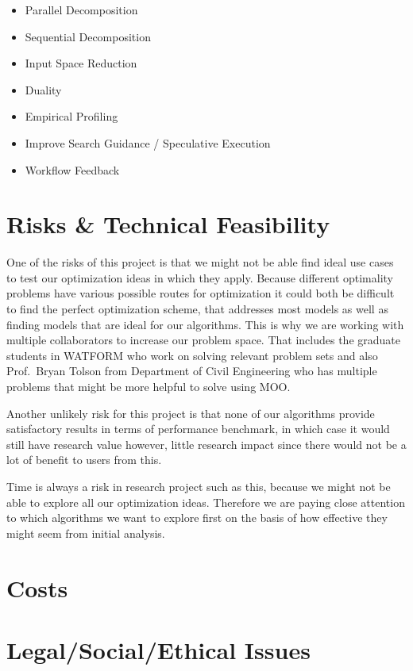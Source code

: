 \documentclass[11pt]{article}
\begin{document}
\begin{itemize}
  \item Parallel Decomposition
  \item Sequential Decomposition
  \item Input Space Reduction
  \item Duality
  \item Empirical Profiling
  \item Improve Search Guidance / Speculative Execution
  \item Workflow Feedback
\end{itemize}

\section{Risks \& Technical Feasibility}
One of the risks of this project is that we might not be able find ideal use cases to test our optimization ideas in which they apply. Because different optimality problems have various possible routes for optimization it could both be difficult to find the perfect optimization scheme, that addresses most models as well as finding models that are ideal for our algorithms. This is why we are working with multiple collaborators to increase our problem space. That includes the graduate students in WATFORM who work on solving relevant problem sets and also Prof.\ Bryan Tolson from Department of Civil Engineering who has multiple problems that might be more helpful to solve using MOO.

Another unlikely risk for this project is that none of our algorithms provide satisfactory results in terms of performance benchmark, in which case it would still have research value however, little research impact since there would not be a lot of benefit to users from this.

Time is always a risk in research project such as this, because we might not be able to explore all our optimization ideas. Therefore we are paying close attention to which algorithms we want to explore first on the basis of how effective they might seem from initial analysis.
\section{Costs}

\section{Legal/Social/Ethical Issues}

\end{document}
